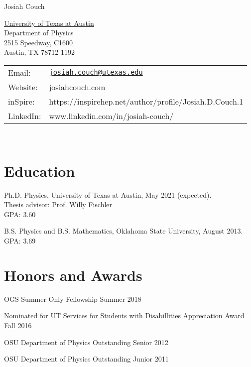\documentclass[letterpaper]{article}
\def\name{Josiah Couch}
\renewenvironment{itemize}{
  \begin{list}{}{
    \setlength{\leftmargin}{1.5em}
  }
}{
  \end{list}
}
\begin{document}
{\huge \name}


\vspace{0.25in}

\begin{minipage}{0.45\linewidth}
  \href{}{University of Texas at Austin} \\
  Department of Physics \\
  2515 Speedway, C1600 \\
  Austin, TX 78712-1192
\end{minipage}
\begin{minipage}{0.45\linewidth}
  \begin{tabular}{ll}
    Email: & \href{mailto:josiah.couch@utexas.edu}{\tt josiah.couch@utexas.edu} \\
    Website: & josiahcouch.com \\
    inSpire: & https://inspirehep.net/author/profile/Josiah.D.Couch.1\\
    LinkedIn: & www.linkedin.com/in/josiah-couch/ 
  \end{tabular}
\end{minipage}
\

\section*{Education}

\begin{itemize}

\item Ph.D. Physics, University of Texas at Austin, \hfill  May 2021 (expected).\\
  Thesis advisor: Prof. Willy Fischler\\
  GPA: 3.60
  
  
  \item B.S. Physics and B.S. Mathematics, Oklahoma State University, \hfill August 2013.\\
  GPA: 3.69

\end{itemize}

\section*{Honors and Awards}
\begin{itemize} \itemsep1pt \parskip0pt 

\item OGS Summer Only Fellowship \hfill{Summer 2018}

\item Nominated for UT Services for Students with Disabillities Appreciation Award \hfill{Fall 2016}

\item OSU Department of Physics Outstanding Senior \hfill{2012}

\item OSU Department of Physics Outstanding Junior \hfill{2011}
\end{itemize}
\end{document}
